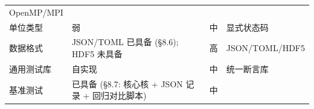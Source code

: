 \documentclass[
]{ctexbook}
\begin{document}
\begin{longtable}[]{@{}llll@{}}
\begin{minipage}[t]{0.22\columnwidth}
OpenMP/MPI\strut
\end{minipage}\tabularnewline
\begin{minipage}[t]{0.22\columnwidth}\raggedright
单位类型\strut
\end{minipage} & \begin{minipage}[t]{0.22\columnwidth}\raggedright
弱\strut
\end{minipage} & \begin{minipage}[t]{0.22\columnwidth}\raggedright
中\strut
\end{minipage} & \begin{minipage}[t]{0.22\columnwidth}\raggedright
显式状态码\strut
\end{minipage}\tabularnewline
\begin{minipage}[t]{0.22\columnwidth}\raggedright
数据格式\strut
\end{minipage} & \begin{minipage}[t]{0.22\columnwidth}\raggedright
JSON/TOML 已具备 (§8.6); HDF5 未具备\strut
\end{minipage} & \begin{minipage}[t]{0.22\columnwidth}\raggedright
高\strut
\end{minipage} & \begin{minipage}[t]{0.22\columnwidth}\raggedright
JSON/TOML/HDF5\strut
\end{minipage}\tabularnewline
\begin{minipage}[t]{0.22\columnwidth}\raggedright
通用测试库\strut
\end{minipage} & \begin{minipage}[t]{0.22\columnwidth}\raggedright
自实现\strut
\end{minipage} & \begin{minipage}[t]{0.22\columnwidth}\raggedright
中\strut
\end{minipage} & \begin{minipage}[t]{0.22\columnwidth}\raggedright
统一断言库\strut
\end{minipage}\tabularnewline
\begin{minipage}[t]{0.22\columnwidth}\raggedright
基准测试\strut
\end{minipage} & \begin{minipage}[t]{0.22\columnwidth}\raggedright
已具备 (§8.7: 核心核 + JSON 记录 + 回归对比脚本)\strut
\end{minipage} & \begin{minipage}[t]{0.22\columnwidth}\raggedright
中\strut
\end{minipage} & \begin{minipage}[t]{0.22\columnwidth}\raggedright

\end{minipage}
\end{longtable}
\end{document}

